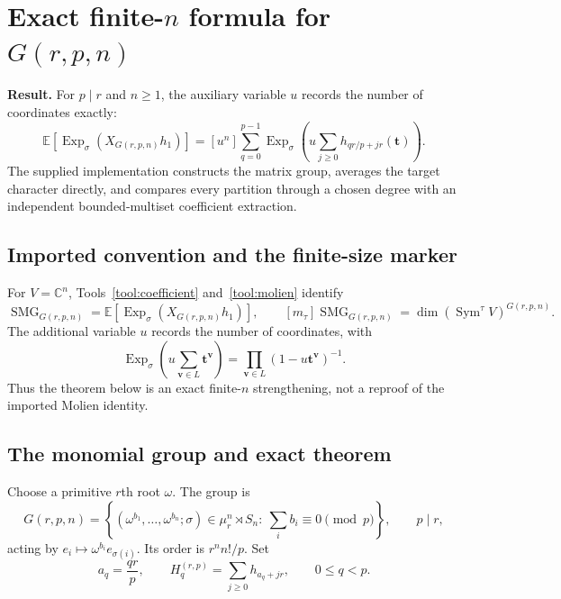 \documentclass[10pt]{article}
\newcommand{\Sym}{\operatorname{Sym}}
\newcommand{\ExpS}{\operatorname{Exp}_{\sigma}}
\newcommand{\SMG}{\operatorname{SMG}}
\newcommand{\MGF}{\SMG}
\newcommand{\smg}[1]{\mathbb E\!\left[\ExpS\!\left(X_{#1}h_1\right)\right]}
\newcommand{\C}{\mathbb C}
\begin{document}
\section[Exact finite-n formula for G(r,p,n)]{Exact finite-$n$ formula for $G(r,p,n)$}\label{proof:grp}
\begingroup
{}
\providecommand{\Ms}{\SMG}
\renewcommand{\Ms}{\SMG}
\providecommand{\Sym}{\operatorname{Sym}}
\renewcommand{\Sym}{\operatorname{Sym}}
\providecommand{\ExpS}{\operatorname{Exp}_{\sigma}}
\renewcommand{\ExpS}{\operatorname{Exp}_{\sigma}}
\providecommand{\coeff}[1]{\left[#1\right]}
\renewcommand{\coeff}[1]{\left[#1\right]}
\providecommand{\C}{\mathbb C}
\renewcommand{\C}{\mathbb C}
\setcounter{theorem}{0}
\setcounter{proposition}{0}
\setcounter{lemma}{0}
\setcounter{corollary}{0}
\setcounter{remark}{0}
\colorbox{Pale}{\parbox{0.94\linewidth}{
\textbf{Result.} For $p\mid r$ and $n\geq1$, the auxiliary variable $u$ records the
number of coordinates exactly:
\[
\boxed{\displaystyle
\smg{G(r,p,n)}
=\coeff{u^n}\sum_{q=0}^{p-1}\ExpS\!\left(
u\sum_{j\geq0}h_{qr/p+jr}(\mathbf t)\right).}
\]
The supplied implementation constructs the matrix group, averages the target
character directly, and compares every partition through a chosen degree with an
independent bounded-multiset coefficient extraction.
}}

\subsection{Imported convention and the finite-size marker}
For $V=\C^n$, Tools~\ref{tool:coefficient} and~\ref{tool:molien} identify
\[
\MGF_{G(r,p,n)}=\smg{G(r,p,n)},\qquad
[m_\tau]\MGF_{G(r,p,n)}=\dim(\Sym^\tau V)^{G(r,p,n)}.
\]
The additional variable $u$ records the number of coordinates, with
\[
\ExpS\!\left(u\sum_{\mathbf v\in L}\mathbf t^{\mathbf v}\right)
=\prod_{\mathbf v\in L}(1-u\mathbf t^{\mathbf v})^{-1}.
\]
Thus the theorem below is an exact finite-$n$ strengthening, not a reproof of
the imported Molien identity.

\subsection{The monomial group and exact theorem}

Choose a primitive $r$th root $\omega$.  The group is
\[
G(r,p,n)=\left\{(\omega^{b_1},\ldots,\omega^{b_n};\sigma)
\in\mu_r^n\rtimes S_n:\ \sum_i b_i\equiv0\pmod p\right\},
\qquad p\mid r,
\]
acting by $e_i\mapsto\omega^{b_i}e_{\sigma(i)}$.  Its order is
$r^n n!/p$.  Set
\[
a_q=\frac{qr}{p},\qquad
H_q^{(r,p)}=\sum_{j\geq0}h_{a_q+jr},\qquad 0\leq q<p.
\]
\end{document}
